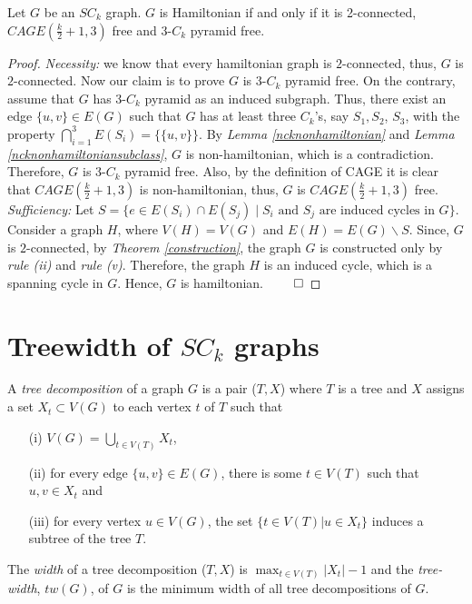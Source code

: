 \documentclass[runningheads]{llncs}
\begin{document}
\begin{theorem}
 Let $G$ be an $SC_k$ graph. $G$ is Hamiltonian if and only if it is 2-connected, $CAGE(\frac{k}{2}+1, 3)$ free and 3-$C_k$ pyramid free.
\end{theorem}
\begin{proof}
\emph{Necessity:} we know that every hamiltonian graph is $2$-connected, thus, $G$ is $2$-connected. Now our claim is to prove $G$ is 3-$C_k$ pyramid free. On the contrary, assume that $G$ has 3-$C_k$ pyramid as an induced subgraph. Thus, there exist an edge $\{u,v\} \in E(G)$ such that $G$ has at least three $C_k$'s, say $S_1, S_2$, $S_3$, with the property $\bigcap_{i = 1}^{3} E(S_i) = \{\{u, v\}\}$. By \emph{Lemma \ref{ncknonhamiltonian}} and \emph{Lemma \ref{ncknonhamiltoniansubclass}}, $G$ is non-hamiltonian, which is a contradiction. Therefore, $G$ is 3-$C_k$ pyramid free. Also, by the definition of CAGE it is clear that $CAGE( \frac{k}{2}+1, 3)$ is non-hamiltonian, thus, $G$ is $CAGE(\frac{k}{2}+1,3)$ free.
\\
\emph{Sufficiency:} Let $S = \{e \in E(S_i)\cap E(S_j) \mid S_i\mbox{ and }S_j \text{ are induced cycles in }G \}$. Consider a graph $H$, where $V(H) = V(G)$ and $E(H) = E(G)\backslash S$. Since, $G$ is $2$-connected, by \emph{Theorem \ref{construction}}, the graph $G$ is constructed only by \emph{rule (ii)} and \emph{rule (v)}. Therefore, the graph $H$ is an induced cycle, which is a spanning cycle in $G$. Hence, $G$ is hamiltonian. $\hfill \qed$
\end{proof}

\section{Treewidth of $SC_k$ graphs}
 A \emph{tree decomposition}\cite{kloks} of a graph $G$ is a pair ($T,X$) where $T$ is a tree and $X$ assigns a set $X_t \subset V(G)$ to each vertex $t$ of $T$ such that 
\begin{itemize}
\item[(i)] $V(G) = \bigcup_{t \in V(T)} X_t$,
\item[(ii)] for every edge $\{u,v\} \in E(G)$, there is some $t \in V(T)$ such that $u, v \in X_t$ and
\item[(iii)] for every vertex $u \in V(G)$, the set $\{ t \in V(T)\vert u \in X_t \}$ induces a subtree of the tree $T$.
\end{itemize}
The \emph{width} of a tree decomposition ($T,X$) is $\max_{t \in V(T)} \vert X_t \vert - 1$ and the \emph{tree-width}, $tw(G)$, of $G$ is the minimum width of all tree decompositions of $G$.  
\end{document}
